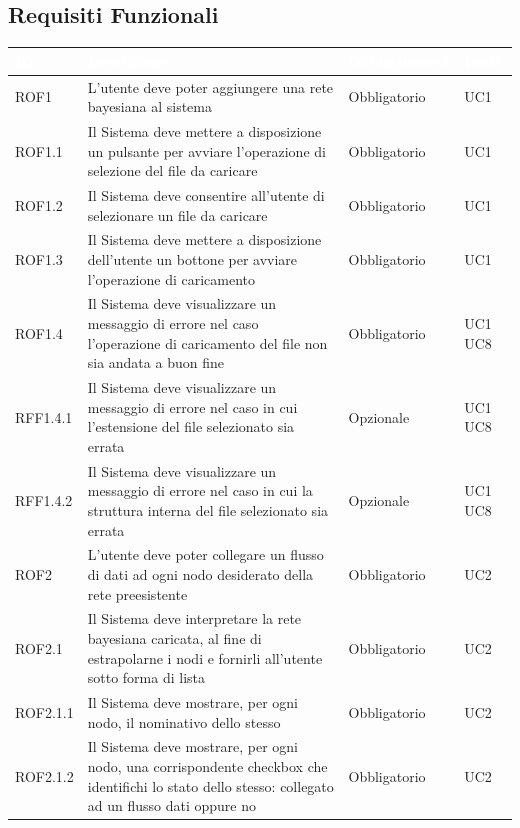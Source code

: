 \newpage
\subsection{Requisiti Funzionali}\label{RF}
\begin{center}
\begin{longtable}[c]{|m{}|m{}|m{}|m{}|}
\hline
\rowcolor{bluelogo}\textbf{\textcolor{white}{ID}} & \textbf{\textcolor{white}{Descrizione}} & \textbf{\textcolor{white}{Obbligatorietà}} & \textbf{\textcolor{white}{Fonti}}\\
\hline \hline
\endhead
ROF1 & L'utente deve poter aggiungere una rete bayesiana al sistema & Obbligatorio & UC1\\
\hline
\rowcolor{grigio}ROF1.1 & Il Sistema deve mettere a disposizione un pulsante per avviare l'operazione di selezione del file da caricare & Obbligatorio & UC1\\
\hline
ROF1.2 & Il Sistema deve consentire all'utente di selezionare un file da caricare & Obbligatorio & UC1\\
\hline
\rowcolor{grigio}ROF1.3 & Il Sistema deve mettere a disposizione dell'utente un bottone per avviare l'operazione di caricamento & Obbligatorio & UC1\\
\hline
ROF1.4 & Il Sistema deve visualizzare un messaggio di errore nel caso l'operazione di caricamento del file non sia andata a buon fine & Obbligatorio & UC1 UC8\\
\hline
\rowcolor{grigio}RFF1.4.1 & Il Sistema deve visualizzare un messaggio di errore nel caso in cui l'estensione del file selezionato sia errata & Opzionale & UC1 UC8\\
\hline
RFF1.4.2 & Il Sistema deve visualizzare un messaggio di errore nel caso in cui la struttura interna del file selezionato sia errata & Opzionale & UC1 UC8\\
\hline
\rowcolor{grigio}ROF2 & L'utente deve poter collegare un flusso di dati ad ogni nodo desiderato della rete preesistente & Obbligatorio & UC2\\
\hline
ROF2.1 & Il Sistema deve interpretare la rete bayesiana caricata, al fine di estrapolarne i nodi e fornirli all'utente sotto forma di lista & Obbligatorio & UC2\\
\hline
\rowcolor{grigio}ROF2.1.1 & Il Sistema deve mostrare, per ogni nodo, il nominativo dello stesso & Obbligatorio & UC2\\
\hline
ROF2.1.2 & Il Sistema deve mostrare, per ogni nodo, una corrispondente checkbox che identifichi lo stato dello stesso: collegato ad un flusso dati oppure no & Obbligatorio & UC2\\

\end{longtable}
\end{center}
